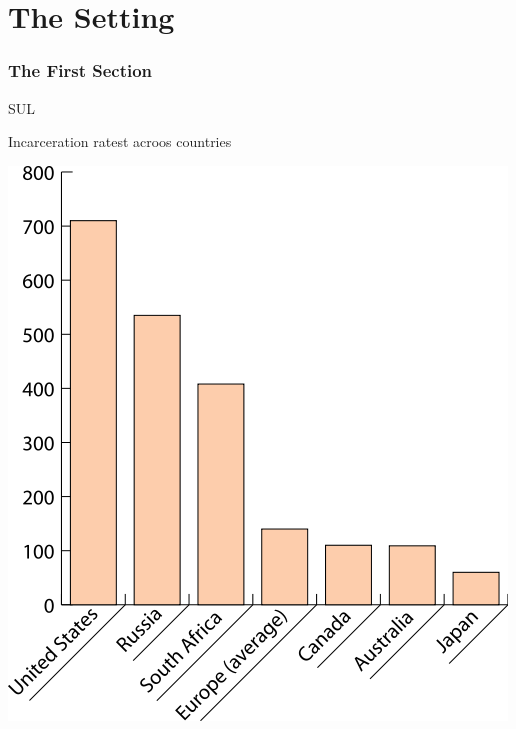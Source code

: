 \documentclass[print,Draft]{faosyb}
\begin{document}
\mainmatter
{}
\part{The Setting}
\lipsum
\EndPartIntro

\section{The First Section}
\label{sec:first}



\begin{chart}{S}{UL}
\caption{Incarceration ratest acroos countries}
\label{chart:incarceration}
\includegraphics[width=\chartwidth,height=\chartheight]{incarceration}  
\end{chart}
\end{document}
